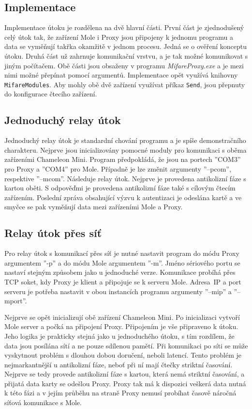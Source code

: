 \subsection{Implementace}

Implementace útoku je rozdělena na dvě hlavní části. První část je zjednodušený celý útok tak, že zařízení Mole i Proxy jsou připojeny k jednomu programu a data se vyměňují takřka okamžitě v jednom procesu. Jedná se o ověření konceptu útoku. Druhá část už zahrnuje komunikační vrstvu, a je tak možné komunikovat s jiným počítačem. Obě části jsou obsaženy v programu \emph{MifareProxy.exe} a je mezi nimi možné přepínat pomocí argumentů. Implementace opět využívá knihovny \verb|MifareModules|. Aby mohly obě dvě zařízení využívat příkaz \verb|Send|, jsou přepnuty do konfigurace čtecího zařízení.
\par

\subsection*{Jednoduchý relay útok}
Jednoduchý relay útok je standardní chování programu a je spíše demonstračního charakteru. Nejprve jsou inicializovány pomocné moduly pro komunikaci s oběma zařízeními Chameleon Mini. Program předpokládá, že jsou na portech ''COM3'' pro Proxy a ''COM4'' pro Mole. Případně je lze změnit argumenty ''--pcom'', respektive ''--mcom''. Následuje relay útok. Nejprve je provedena antikolizní fáze s kartou oběti. S odpověďmi je provedena antikolizní fáze také s cílovým čtecím zařízením. Poslední zpráva obsahující výzvu k autentizaci je odeslána kartě a ve smyčce se pak vyměňují data mezi zařízeními Mole a Proxy.

\subsection*{Relay útok přes síť}
Pro relay útok s komunikací přes síť je nutné nastavit program do módu Proxy argumentem ''-p'' a do módu Mole argumentem ''-m''. Jméno sériového portu se nastaví stejným způsobem jako u jednoduché verze. Komunikace probíhá přes TCP soket, kdy Proxy je klient a připojuje se k serveru Mole. Adresa~IP a port serveru je potřeba nastavit v obou instancích programu argumenty ''--mip'' a ''--mport''. \par
Nejprve se opět inicializují obě zařízení Chameleon Mini. Po inicializaci vytvoří Mole server a počká na připojení Proxy. Připojením je vše připraveno k útoku. Jeho logika je prakticky stejná jako u jednoduchého útoku, s tím rozdílem, že data jsou posílána sítí a ne pouze sdílenou pamětí. Při komunikaci po síti se může vyskytnout problém s dlouhou dobou doručení, neboli latencí. Tento problém je nejmarkantnější u antikolizní fáze, neboť při ní mají čtečky striktní časování. Nejprve se tedy provede antikolizní fáze s kartou, která nemá striktní časování, a přijatá data karty se odešlou Proxy. Proxy tak má k dispozici veškerá data nutná k této fázi a v jejím průběhu na straně Proxy nemusí probíhat časově náročná síťová komunikace s Mole. 

